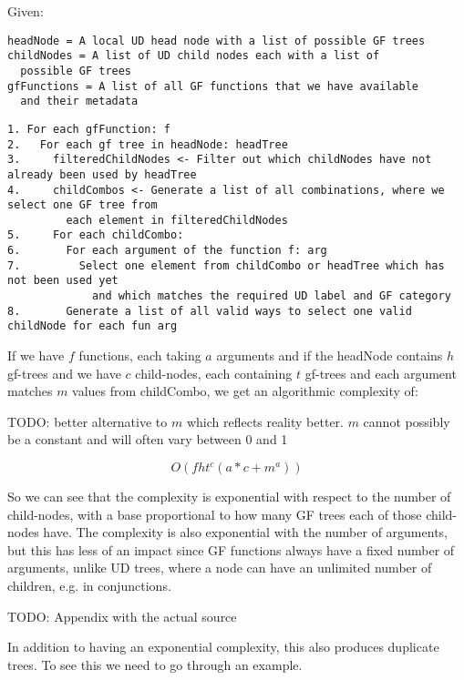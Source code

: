 Given:
\begin{verbatim}
headNode = A local UD head node with a list of possible GF trees
childNodes = A list of UD child nodes each with a list of
  possible GF trees
gfFunctions = A list of all GF functions that we have available
  and their metadata
\end{verbatim}



\begin{verbatim}
1. For each gfFunction: f
2.   For each gf tree in headNode: headTree
3.     filteredChildNodes <- Filter out which childNodes have not already been used by headTree
4.     childCombos <- Generate a list of all combinations, where we select one GF tree from
         each element in filteredChildNodes
5.     For each childCombo:
6.       For each argument of the function f: arg
7.         Select one element from childCombo or headTree which has not been used yet
             and which matches the required UD label and GF category
8.       Generate a list of all valid ways to select one valid childNode for each fun arg
\end{verbatim}

If we have $f$ functions, each taking $a$ arguments and
if the headNode contains $h$ gf-trees
and we have $c$ child-nodes, each containing $t$ gf-trees
and each argument matches $m$ values from childCombo, we get an algorithmic complexity of:

TODO: better alternative to $m$ which reflects reality better. $m$ cannot possibly be a constant and will often vary between 0 and 1

$$
O(f h t^c (a*c+m^a))
$$

So we can see that the complexity is exponential with respect to the number of child-nodes, with a base proportional to how many GF trees each of those child-nodes have. The complexity is also exponential with the number of arguments, but this has less of an impact since GF functions always have a fixed number of arguments, unlike UD trees, where a node can have an unlimited number of children, e.g. in conjunctions.

TODO: Appendix with the actual source

In addition to having an exponential complexity, this also produces duplicate trees. To see this we need to go through an example.


